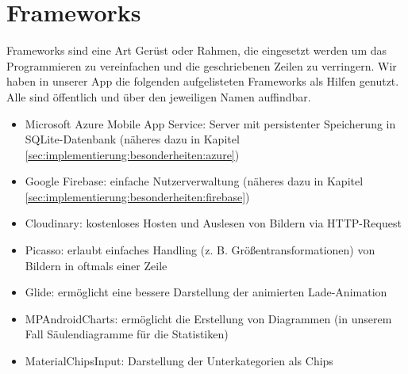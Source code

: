 \section{Frameworks}
\label{sec:grundlagen:frameworks}
Frameworks sind eine Art Gerüst oder Rahmen, die eingesetzt werden um das Programmieren zu vereinfachen und die geschriebenen Zeilen zu verringern. Wir haben in unserer App die folgenden aufgelisteten Frameworks als Hilfen genutzt. Alle sind öffentlich und über den jeweiligen Namen auffindbar.
\begin{itemize}
\item Microsoft Azure Mobile App Service: Server mit persistenter Speicherung in SQLite-Datenbank (näheres dazu in Kapitel \ref{sec:implementierung:besonderheiten:azure})
\item Google Firebase: einfache Nutzerverwaltung (näheres dazu in Kapitel \ref{sec:implementierung:besonderheiten:firebase})
\item Cloudinary: kostenloses Hosten und Auslesen von Bildern via HTTP-Request
\item Picasso: erlaubt einfaches Handling (z. B. Größentransformationen) von Bildern in oftmals einer Zeile
\item Glide: ermöglicht eine bessere Darstellung der animierten Lade-Animation
\item MPAndroidCharts: ermöglicht die Erstellung von Diagrammen (in unserem Fall Säulendiagramme für die Statistiken)
\item MaterialChipsInput: Darstellung der Unterkategorien als Chips
\end{itemize}




















